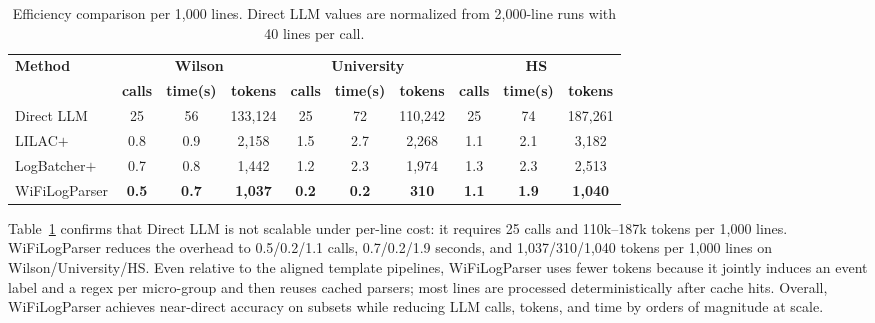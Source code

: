 \documentclass[journal]{IEEEtran}
\begin{document}
\begin{table}[!t]
	\centering
	\caption{Efficiency comparison per 1,000 lines. Direct LLM values are normalized from 2,000-line runs with 40 lines per call.}
	\label{tab:efficiency}
	\begin{tabular}{lccc|ccc|ccc}
		\toprule
		\multirow{2}{*}{\textbf{Method}}         &
		\multicolumn{3}{c|}{\textbf{Wilson}}     &
		\multicolumn{3}{c|}{\textbf{University}} &
		\multicolumn{3}{c}{\textbf{HS}}                                                                                                                                                                 \\
		\cmidrule(lr){2-4}\cmidrule(lr){5-7}\cmidrule(lr){8-10}
		                                         & \textbf{calls}   & \textbf{time(s)} & \textbf{tokens}  &
		\textbf{calls}                           & \textbf{time(s)} & \textbf{tokens}  &
		\textbf{calls}                           & \textbf{time(s)} & \textbf{tokens}                                                                                                                   \\
		\midrule
		Direct LLM                               & 25               & 56               & 133{,}124        & 25           & 72           & 110{,}242    & 25           & 74           & 187{,}261        \\
		LILAC$+$                                 & 0.8              & 0.9              & 2{,}158          & 1.5          & 2.7          & 2{,}268      & 1.1          & 2.1          & 3{,}182          \\
		LogBatcher$+$                            & 0.7              & 0.8              & 1{,}442          & 1.2          & 2.3          & 1{,}974      & 1.3          & 2.3          & 2{,}513          \\
		\midrule
		WiFiLogParser                            & \textbf{0.5}     & \textbf{0.7}     & \textbf{1{,}037} & \textbf{0.2} & \textbf{0.2} & \textbf{310} & \textbf{1.1} & \textbf{1.9} & \textbf{1{,}040} \\
		\bottomrule
	\end{tabular}
\end{table}

Table~\ref{tab:efficiency} confirms that Direct LLM is not scalable under per-line cost: it requires 25 calls and 110k--187k tokens per 1,000 lines. WiFiLogParser reduces the overhead to 0.5/0.2/1.1 calls, 0.7/0.2/1.9 seconds, and 1{,}037/310/1{,}040 tokens per 1,000 lines on Wilson/University/HS. Even relative to the aligned template pipelines, WiFiLogParser uses fewer tokens because it jointly induces an event label and a regex per micro-group and then reuses cached parsers; most lines are processed deterministically after cache hits. Overall, WiFiLogParser achieves near-direct accuracy on subsets while reducing LLM calls, tokens, and time by orders of magnitude at scale.
\end{document}
